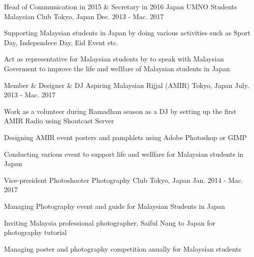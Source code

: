 

\begin{cventries}

  \cventry
    {Head of Communication in 2015 \& Secretary in 2016} %
    {Japan UMNO Students Malaysian Club} %
    {Tokyo, Japan} %
    {Dec. 2013 - Mac. 2017} %
    {
      \begin{cvitems} %
        \item {Supporting Malaysian students in Japan by doing various activities such as Sport Day, Independece Day, Eid Event etc.}
        \item {Act as representative for Malaysian students by to speak with Malaysian Goverment to improve the life and wellfare of Malaysian students
			in Japan}
      \end{cvitems}
    }

  \cventry
	{Member \& Designer \& DJ} %
	{Aspiring Malaysian Rijjal (AMIR)} %
    {Tokyo, Japan} %
    {July. 2013 - Mac. 2017} %
    {
      \begin{cvitems} %
        \item {Work as a volunteer during Ramadhan season as a DJ by setting up the first AMIR Radio using Shoutcast Server}
        \item {Designing AMIR event posters and pamphlets using Adobe Photoshop or GIMP}
        \item {Conducting various event to support life and wellfare for Malaysian students in Japan}
      \end{cvitems}
    }


  \cventry
	{Vice-president} %
	{Photoshooter Photography Club} %
    {Tokyo, Japan} %
    {Jan. 2014 - Mac. 2017} %
    {
      \begin{cvitems} %
        \item {Managing Photography event and guide for Malaysian Students in Japan}
        \item {Inviting Malaysia professional photographer, Saiful Nang to Japan for photography tutorial}
        \item {Managing poster and photography competition anually for Malaysian students}
      \end{cvitems}
    }


\end{cventries}
